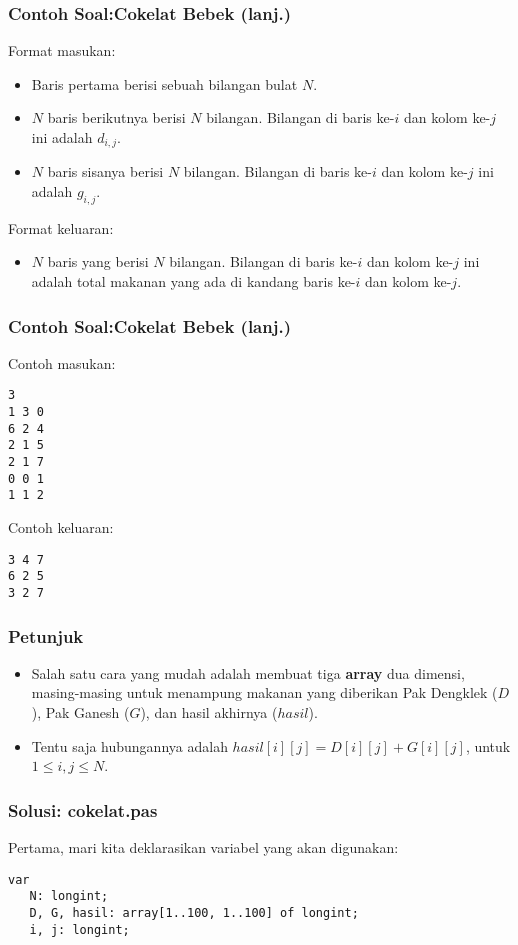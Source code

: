 \documentclass{beamer}
\begin{document}
\begin{frame}
\frametitle{Contoh Soal:\newline Cokelat Bebek (lanj.)}
Format masukan:
\begin{itemize}
	\item Baris pertama berisi sebuah bilangan bulat $N$.
	\item $N$ baris berikutnya berisi $N$ bilangan. Bilangan di baris ke-$i$ dan kolom ke-$j$ ini adalah $d_{i,j}$.
	\item $N$ baris sisanya berisi $N$ bilangan. Bilangan di baris ke-$i$ dan kolom ke-$j$ ini adalah $g_{i,j}$.
\end{itemize}
Format keluaran:
\begin{itemize}
	\item $N$ baris yang berisi $N$ bilangan. Bilangan di baris ke-$i$ dan kolom ke-$j$ ini adalah total makanan yang ada di kandang baris ke-$i$ dan kolom ke-$j$.
\end{itemize}
\end{frame}

\begin{frame}[fragile]
\frametitle{Contoh Soal:\newline Cokelat Bebek (lanj.)}
Contoh masukan:
\begin{lstlisting}
3
1 3 0
6 2 4
2 1 5
2 1 7
0 0 1
1 1 2
\end{lstlisting}
Contoh keluaran:
\begin{lstlisting}
3 4 7
6 2 5
3 2 7
\end{lstlisting}
\end{frame}

\begin{frame}
\frametitle{Petunjuk}
\begin{itemize}
	\item Salah satu cara yang mudah adalah membuat tiga \textbf{array} dua dimensi, masing-masing untuk menampung makanan yang diberikan Pak Dengklek ($D$), Pak Ganesh ($G$), dan hasil akhirnya ($hasil$).
	\item Tentu saja hubungannya adalah $hasil[i][j] = D[i][j] + G[i][j]$, untuk $1 \le i,j \le N$.
\end{itemize}
\end{frame}

\begin{frame}[fragile]
\frametitle{Solusi: cokelat.pas}
Pertama, mari kita deklarasikan variabel yang akan digunakan:
\begin{lstlisting}
var
   N: longint;
   D, G, hasil: array[1..100, 1..100] of longint;
   i, j: longint;
   
\end{lstlisting}
\end{frame}
\end{document}
